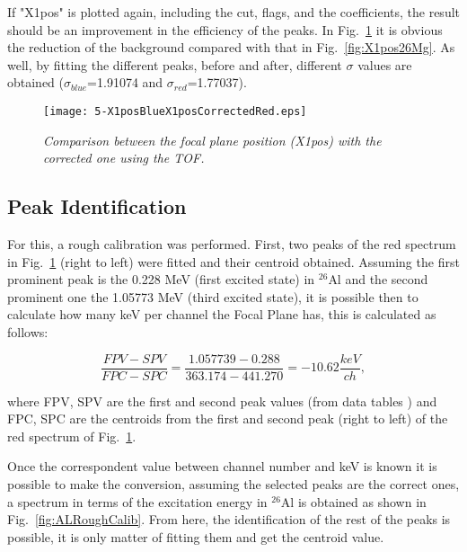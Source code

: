 \documentclass[11pt]{report}
\begin{document}
\noindent
If "X1pos" is plotted again, including the cut, flags, and the coefficients, the result should be an improvement in the efficiency of the peaks. In 
Fig.~\ref{fig:X1posBlueX1posCorrectedRed} it is obvious the reduction of the background compared with that in Fig.~\ref{fig:X1pos26Mg}. As well,
by fitting the different peaks, before and after, different $\sigma$ values are obtained ($\sigma_{blue}$=1.91074 and $\sigma_{red}$=1.77037).

\begin{figure}[h]
 \begin{center}
\texttt{[image: 5-X1posBlueX1posCorrectedRed.eps]}  
 \end{center}
\vspace*{-4mm}
\caption{\label{fig:X1posBlueX1posCorrectedRed} \it Comparison between the focal plane position (X1pos) with the corrected one using the TOF.}
\end{figure}
\vspace*{4mm}


\subsection{Peak Identification}

For this, a rough calibration was performed. First, two peaks of 
the red spectrum in Fig.~\ref{fig:X1posBlueX1posCorrectedRed} (right to left) were fitted and their 
centroid obtained. Assuming the first prominent peak is the 0.228 MeV (first excited state) 
in $^{26}$Al and the second prominent one the 1.05773 MeV (third excited state), it 
is possible then to calculate how many keV per channel the Focal Plane has, this is calculated as follows:

\begin{equation}
\frac{FPV-SPV}{FPC-SPC}=\frac{1.057739-0.288}{363.174-441.270}=-10.62 \frac{keV}{ch},
\end{equation}

\noindent
where FPV, SPV are the first and second peak values (from data tables \cite{nndc}) and FPC, 
SPC are the centroids from the first and second peak (right to left) of the red
spectrum of Fig.~\ref{fig:X1posBlueX1posCorrectedRed}.

\noindent
Once the correspondent value between channel number and keV is known it is possible to 
make the conversion, assuming the selected peaks are the correct ones, 
a spectrum in terms of the excitation energy in $^{26}$Al is obtained as shown in 
Fig.~\ref{fig:ALRoughCalib}. From here, the identification of the rest of the peaks is possible, 
it is only matter of fitting them and get the centroid value.
\end{document}
